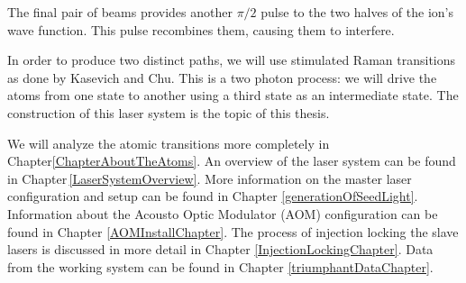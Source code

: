 The final pair of beams provides another $\pi/2$ pulse to the two halves of the ion's wave function. This pulse recombines them, causing them to interfere.

In order to produce two distinct paths, we will use stimulated Raman transitions as done by Kasevich and Chu\cite{kasevichChu1991}. This is a two photon process: we will drive the atoms from one state to another using a third state as an intermediate state.  The construction of this laser system is the topic of this thesis.


We will analyze the atomic transitions more completely in Chapter\ref{ChapterAboutTheAtoms}. An overview of the laser system can be found in Chapter\,\ref{LaserSystemOverview}. More information on the master laser configuration and setup can be found in Chapter \ref{generationOfSeedLight}. Information about the Acousto Optic Modulator (AOM) configuration can be found in Chapter \ref{AOMInstallChapter}. The process of injection locking the slave lasers is discussed in more detail in Chapter \ref{InjectionLockingChapter}. Data from the working system can be found in Chapter \ref{triumphantDataChapter}.




